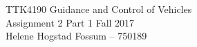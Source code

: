 \documentclass[a4paper]{article}
\begin{document}
\begin{titlepage}
\begin{center}
\Large TTK4190 Guidance and Control of Vehicles \\
\large{Assignment 2 Part 1}
\vspace{8pt}
\large Fall 2017 \\
\vspace{8pt}
\large Helene Hogstad Fossum -- 750189
\end{center}
\vspace{8pt}
\end{titlepage}





\newpage


\end{document}
